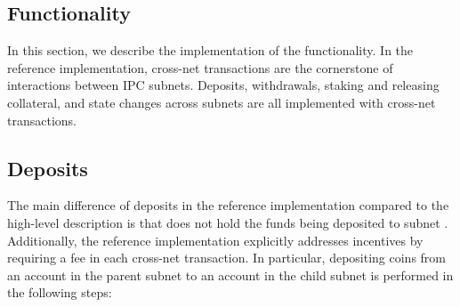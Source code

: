 
\subsection{Functionality} 
\label{sec:refimplfunc}
In this section, we describe the implementation of the functionality. In the reference implementation, cross-net transactions are the cornerstone of interactions between IPC subnets. Deposits, withdrawals, staking and releasing collateral, and state changes across subnets are all implemented with cross-net transactions.

\subsection{Deposits}
The main difference of deposits in the reference implementation compared to the high-level description is that  does not hold the funds being deposited to subnet . Additionally, the reference implementation explicitly addresses incentives by requiring a fee in each cross-net transaction. In particular, depositing  coins from an account  in the parent subnet  to an account  in the child subnet  is performed in the following steps:

